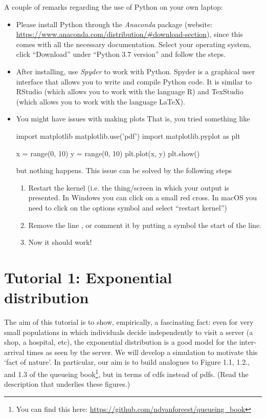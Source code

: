 A couple of remarks regarding the use of Python on your own laptop:
\begin{itemize}
\item Please install Python through the \emph{Anaconda} package (website: \url{https://www.anaconda.com/distribution/#download-section}), since this comes with all the necessary documentation. Select your operating system, click ``Download'' under ``Python 3.7 version'' and follow the steps.
\item After installing, use \emph{Spyder} to work with Python. Spyder is a graphical user interface that allows you to write and compile Python code. It is similar to RStudio (which allows you to work with the language R) and TexStudio (which allows you to work with the language \LaTeX\/). 
\item You might have issues with making plots That is, you tried something like
\begin{pyverbatim}
import matplotlib
matplotlib.use('pdf')
import matplotlib.pyplot as plt

x = range(0, 10)
y = range(0, 10)
plt.plot(x, y)
plt.show()
\end{pyverbatim}
but nothing happens. This issue can be solved by the following steps
\begin{enumerate}
\item Restart the kernel (i.e. the thing/screen in which your output is presented. In Windows you can click on a small red cross. In macOS you need to click on the options symbol and select ``restart kernel'')
\item Remove the line , or comment it by putting a \pyv{#} symbol the start of the line.
\item Now it should work!
\end{enumerate} 
\end{itemize}


\clearpage



\section{Tutorial 1: Exponential distribution}

The aim of this tutorial is to show, empirically, a fascinating fact: even for very small populations in which individuals decide independently to visit a server (a shop, a hospital, etc), the exponential distribution is a good model for the inter-arrival times as seen by the server.
We will develop a simulation to motivate this `fact of nature'.
In particular, our aim is to build analogues to Figure 1.1, 1.2., and 1.3 of the queueing book\footnote{You can find this here: \url{https://github.com/ndvanforeest/queueing_book}}, but in terms of cdfs instead of pdfs.
(Read the description that underlies these figures.)


